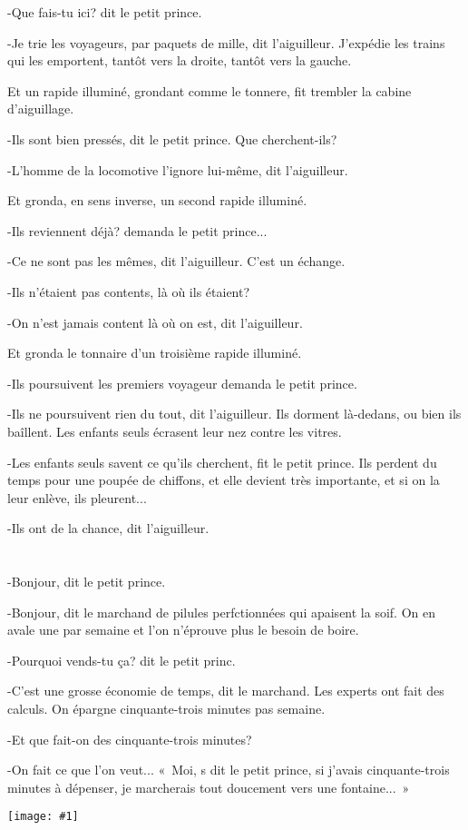 \documentclass{report}
\newcommand{\parachapter}[2][]{\end{paracol}\chapter[#1]{#2}\begin{paracol}{2}}
\newcommand{\incpic}[1]{%
\end{paracol}
\begin{center}
    \texttt{[image: \#1]}
\end{center}
\begin{paracol}{2}}
\begin{document}
\begin{paracol}{2}
-Que fais-tu ici? dit le petit prince.

-Je trie les voyageurs, par paquets de mille, dit l'aiguilleur. J'expédie les trains qui les emportent, tantôt vers la droite, tantôt vers la gauche.

Et un rapide illuminé, grondant comme le tonnere, fit trembler la cabine d'aiguillage.

-Ils sont bien pressés, dit le petit prince. Que cherchent-ils?

-L'homme de la locomotive l'ignore lui-même, dit l'aiguilleur.

Et gronda, en sens inverse, un second rapide illuminé.

-Ils reviennent déjà? demanda le petit prince...

-Ce ne sont pas les mêmes, dit l'aiguilleur. C'est un échange.

-Ils n'étaient pas contents, là où ils étaient?

-On n'est jamais content là où on est, dit l'aiguilleur.

Et gronda le tonnaire d'un troisième rapide illuminé.

-Ils poursuivent les premiers voyageur demanda le petit prince.

-Ils ne poursuivent rien du tout, dit l'aiguilleur. Ils dorment là-dedans, ou bien ils ba\^illent. Les enfants seuls écrasent leur nez contre les vitres.

-Les enfants seuls savent ce qu'ils cherchent, fit le petit prince. Ils perdent du temps pour une poupée de chiffons, et elle devient très importante, et si on la leur enlève, ils pleurent...

-Ils ont de la chance, dit l'aiguilleur.
\parachapter{} %
-Bonjour, dit le petit prince.

-Bonjour, dit le marchand de pilules perfctionnées qui apaisent la soif. On en avale une par semaine et l'on n'éprouve plus le besoin de boire.

-Pourquoi vends-tu ça? dit le petit princ.

-C'est une grosse économie de temps, dit le marchand. Les experts ont fait des calculs. On épargne cinquante-trois minutes pas semaine.

-Et que fait-on des cinquante-trois minutes?

-On fait ce que l'on veut...
«~Moi, s dit le petit prince, si j'avais cinquante-trois minutes à dépenser, je marcherais tout doucement vers une fontaine...~»

\incpic{pic/image40.png}


\end{paracol}
\end{document}
